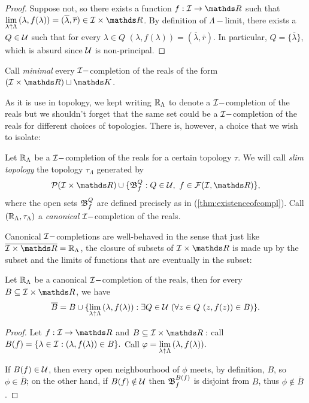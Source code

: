 \documentclass[draft.tex]{subfiles}
\begin{document}
\begin{proof}
Suppose not, so there exists a function $f: \cl{I} \to \RR$ such that $\lambdalim{(\lambda, f(\lambda))} = (\overline{\lambda}, \overline{r}) \in \cl{I} \times \RR$. By definition of $\Lambda-$limit, there exists a $Q \in \mathcal{U}$ such that for every $\lambda \in Q$ $(\lambda, f(\lambda)) = (\overline{\lambda}, \overline{r})$. In particular, $Q = \{\overline{\lambda}\}$, which is absurd since $\mathcal{U}$ is non-principal.
\end{proof}
Call \emph{minimal} every $\mathcal{I}-$completion of the reals of the form $(\cl{I} \times \RR) \sqcup \struct{K}$.
\par As it is use in topology, we kept writing $\mathbb{R}_{\Lambda}$ to denote a $\mathcal{I}-$completion of the reals but we shouldn't forget that the same set could be a $\mathcal{I}-$completion of the reals for different choices of topologies. There is, however, a choice that we wish to isolate:
\begin{definition}
Let $\mathbb{R}_{\Lambda}$ be a $\mathcal{I}-$completion of the reals for a certain topology $\tau$. We will call \emph{slim topology} the topology $\tau_{\Lambda}$ generated by
\begin{equation*}
    \powerset{\cl{I} \times \RR} \cup \{\fk{B}^{Q}_{f}: Q \in \cl{U}, \ f \in \cl{F}(\cl{I},\RR)\},
\end{equation*}
where the open sets $\mathfrak{B}^{Q}_{f}$ are defined precisely as in (\ref{thm:existenceofcompl}). Call $(\mathbb{R}_{\Lambda}, \tau_{\Lambda})$ a \emph{canonical} $\mathcal{I}-$completion of the reals.
\end{definition}
Canonical $\mathcal{I}-$completions are well-behaved in the sense that just like $\overline{\cl{I}\times \RR} = \completion$, the closure of subsets of $\cl{I} \times \RR$ is made up by the subset and the limits of functions that are eventually in the subset:
\begin{theorem}
Let $\mathbb{R}_{\Lambda}$ be a canonical $\mathcal{I}-$completion of the reals, then for every $B \subseteq \cl{I} \times \RR$, we have 
\begin{equation*}
\overline{B} = B \cup \{\lim\limits_{\lambda \uparrow \Lambda}{(\lambda, f(\lambda))}: \exists Q \in \mathcal{U} \ (\forall z \in Q \ (z,f(z)) \in B)\}.
\end{equation*}
\end{theorem}
\begin{proof}
Let $f: \cl{I} \to \RR$ and $B \subseteq \cl{I} \times \RR:$ call $B(f) = \{\lambda \in \mathcal{I}: (\lambda, f(\lambda)) \in B\}.$ Call $\varphi = \lim\limits_{\lambda \uparrow \Lambda}{(\lambda, f(\lambda))}.$
\par If $B(f) \in \mathcal{U}$, then every open neighbourhood of $\phi$ meets, by definition, $B$, so $\phi \in \overline{B}$; on the other hand, if $B(f) \notin \mathcal{U}$ then $\mathfrak{B}^{B(f)}_{f}$ is disjoint from $B$, thus $\phi \notin \overline{B}$.
\end{proof}
\end{document}
